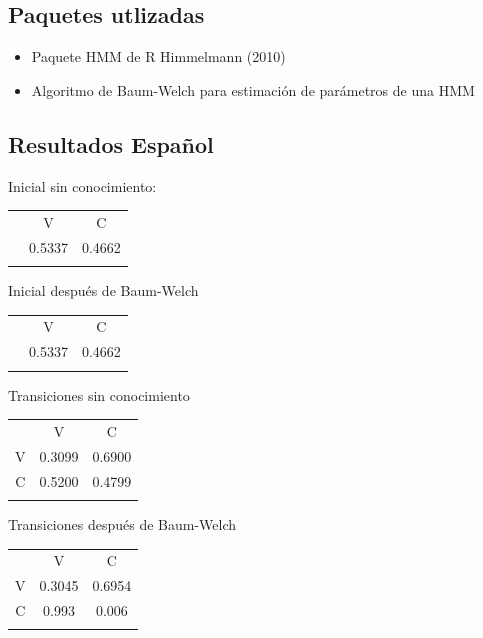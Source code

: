 \documentclass[]{article}
\begin{document}
\subsection{Paquetes utlizadas}\label{paquetes-utlizadas}

\begin{itemize}
\item
  Paquete HMM de R Himmelmann (2010)
\item
  Algoritmo de Baum-Welch para estimación de parámetros de una HMM
\end{itemize}

\subsection{Resultados Español}\label{resultados-espanol}

Inicial sin conocimiento:

\begin{longtable}[c]{@{}ccc@{}}
\toprule\addlinespace
& V & C
\\\addlinespace
\midrule\endhead
& 0.5337 & 0.4662
\\\addlinespace
\bottomrule
\end{longtable}

Inicial después de Baum-Welch

\begin{longtable}[c]{@{}ccc@{}}
\toprule\addlinespace
& V & C
\\\addlinespace
\midrule\endhead
& 0.5337 & 0.4662
\\\addlinespace
\bottomrule
\end{longtable}

Transiciones sin conocimiento

\begin{longtable}[c]{@{}ccc@{}}
\toprule\addlinespace
& V & C
\\\addlinespace
\midrule\endhead
V & 0.3099 & 0.6900
\\\addlinespace
C & 0.5200 & 0.4799
\\\addlinespace
\bottomrule
\end{longtable}

Transiciones después de Baum-Welch

\begin{longtable}[c]{@{}ccc@{}}
\toprule\addlinespace
& V & C
\\\addlinespace
\midrule\endhead
V & 0.3045 & 0.6954
\\\addlinespace
C & 0.993 & 0.006
\\\addlinespace
\bottomrule
\end{longtable}
\end{document}
